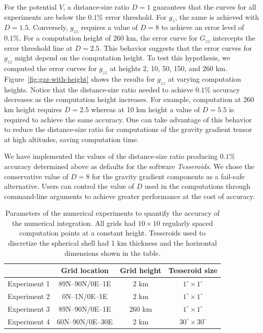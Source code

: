 \documentclass[paper,twocolumn,twoside]{geophysics}
\begin{document}
For the potential $V$, a distance-size ratio $D=1$ guarantees that the curves
for all experiments are below the $0.1\%$ error threshold.
For $g_z$, the same is achieved with $D=1.5$.
Conversely, $g_{zz}$ requires a value of $D=8$ to achieve an error level of
$0.1\%$.
For a computation height of 260 km, the error curve for $G_{zz}$
intercepts the error threshold line at $D=2.5$.
This behavior suggests that the error curves for $g_{zz}$ might depend on the
computation height.
To test this hypothesis, we computed the error curves for $g_{zz}$ at
heights 2, 10, 50, 150, and 260 km.
Figure~\ref{fig:gzz-with-height} shows the results for $g_{zz}$ at varying
computation heights.
Notice that the distance-size ratio needed to achieve $0.1\%$ accuracy
decreases as the computation height increases.
For example, computation at 260 km height requires $D=2.5$ whereas at 10 km
height a value of $D=5.5$ is required to achieve the same accuracy.
One can take advantage of this behavior to reduce the distance-size ratio for
computations of the gravity gradient tensor at high altitudes,
saving computation time.


We have implemented the values of the distance-size ratio producing $0.1\%$
accuracy determined above as defaults for the software \emph{Tesseroids}.
We chose the conservative value of $D=8$ for the gravity gradient components
as a fail-safe alternative.
Users can control the value of $D$ used in the computations through
command-line arguments to achieve greater performance at the cost of
accuracy.


\begin{table}
\centering
\begin{tabular}{cccc}
    \hline
    ~             & Grid location & Grid height & Tesseroid size \\
    \hline
    Experiment 1  & 89N--90N/0E--1E & 2 km & $1^\circ \times 1^\circ$ \\
    Experiment 2  & 0N--1N/0E--1E & 2 km & $1^\circ \times 1^\circ$ \\
    Experiment 3  & 89N--90N/0E--1E & 260 km & $1^\circ \times 1^\circ$ \\
    Experiment 4  & 60N--90N/0E--30E & 2 km & $30^\circ \times 30^\circ$ \\
    \hline
\end{tabular}
\caption{
    Parameters of the numerical experiments to quantify the accuracy of
    the numerical integration.
    All grids had $10\times10$ regularly spaced computation points at a
    constant height.
    Tesseroids used to discretize the spherical shell had 1 km thickness and
    the horizontal dimensions shown in the table.
}
\label{tbl:experiment}
\end{table}
\end{document}
